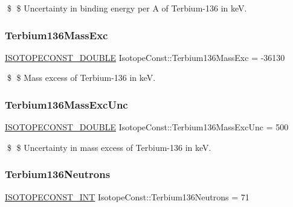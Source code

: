 \$ \$ Uncertainty in binding energy per A of Terbium-\/136 in keV. \mbox{\label{group___isotope_const-_terbium-_tb136_gacb1b4a5978413613c4a887ca8cf74f36}} 
\subsubsection{\texorpdfstring{Terbium136\+Mass\+Exc}{Terbium136MassExc}}
{\footnotesize\ttfamily \mbox{\hyperlink{group___isotope_const-_macros_ga8f45a7272ce02c0b4c65c44636ed719a}{I\+S\+O\+T\+O\+P\+E\+C\+O\+N\+S\+T\+\_\+\+D\+O\+U\+B\+LE}} Isotope\+Const\+::\+Terbium136\+Mass\+Exc = -\/36130}

\$ \$ Mass excess of Terbium-\/136 in keV. \mbox{\label{group___isotope_const-_terbium-_tb136_ga017260d23dac51b0db0fa5f9b3978f1d}} 
\subsubsection{\texorpdfstring{Terbium136\+Mass\+Exc\+Unc}{Terbium136MassExcUnc}}
{\footnotesize\ttfamily \mbox{\hyperlink{group___isotope_const-_macros_ga8f45a7272ce02c0b4c65c44636ed719a}{I\+S\+O\+T\+O\+P\+E\+C\+O\+N\+S\+T\+\_\+\+D\+O\+U\+B\+LE}} Isotope\+Const\+::\+Terbium136\+Mass\+Exc\+Unc = 500}

\$ \$ Uncertainty in mass excess of Terbium-\/136 in keV. \mbox{\label{group___isotope_const-_terbium-_tb136_ga60faa34b6cef6df7ca20802eae3c1313}} 
\subsubsection{\texorpdfstring{Terbium136\+Neutrons}{Terbium136Neutrons}}
{\footnotesize\ttfamily \mbox{\hyperlink{group___isotope_const-_macros_ga5f18360b3e99483a35c32d789e62621c}{I\+S\+O\+T\+O\+P\+E\+C\+O\+N\+S\+T\+\_\+\+I\+NT}} Isotope\+Const\+::\+Terbium136\+Neutrons = 71}

